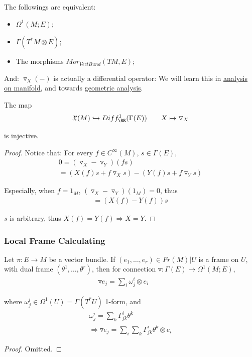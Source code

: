 \documentclass[Total.tex]{subfiles}
\begin{document}
		The followings are equivalent:
		\begin{itemize}
			\item $\Omega^1(M;E)$;
			\item $\Gamma(T^*M\otimes E)$;
			\item The morphisms $Mor_{VectBund}(TM,E)$;
		\end{itemize}
		
		
		And: $\triangledown_X(-)$ is actually a differential operator: We will learn this in \underline{analysis on manifold}, and towards \underline{geometric analysis}.
		
		\begin{proposition}
			The map
			\begin{gather*}
				\mathfrak{X}(M)\hookrightarrow Diff_\RR^1(\Gamma(E))\qquad X\mapsto \triangledown_X
			\end{gather*}
			
			is injective. 
		\end{proposition}
		\begin{proof}
			Notice that: For every $f\in C^\infty(M)$, $s\in \Gamma(E)$, 
			\begin{gather*}
				0=(\triangledown_X-\triangledown_Y)(fs)\\
				=(X(f)s+f\triangledown_X s)-(Y(f)s+f\triangledown_Y s)
			\end{gather*}
			
			Especially, when $f=1_M$, $(\triangledown_X-\triangledown_Y)(1_M)=0$, thus
			\begin{gather*}
				=(X(f)-Y(f))s
			\end{gather*}
			
			$s$ is arbitrary, thus $X(f)=Y(f)\Rightarrow X=Y$.
		\end{proof}
		
		\subsubsection{Local Frame Calculating}
			\begin{proposition}
				Let $\pi:E\rightarrow M$ be a vector bundle. If $(e_1,\dots,e_r)\in Fr(M)|U$ is a frame on $U$, with dual frame $(\theta^1,\dots,\theta^r)$, then for connection $\triangledown:\Gamma(E)\rightarrow \Omega^1(M;E)$,
				\begin{gather*}
					\triangledown e_j=\sum_i \omega^i_j \otimes e_i\qquad 
				\end{gather*}
				
				where $\omega^i_j\in \Omega^1(U)=\Gamma(T^*U)$ 1-form, and 
				\begin{gather*}
					\omega^i_j=\sum_k \Gamma^{i}_{jk} \theta^k\\
					\Rightarrow \triangledown e_j=\sum_i \sum_k \Gamma^i_{jk} \theta^k\otimes e_i
				\end{gather*}
			\end{proposition}
			\begin{proof}
				Omitted.
			\end{proof}
			
\end{document}

